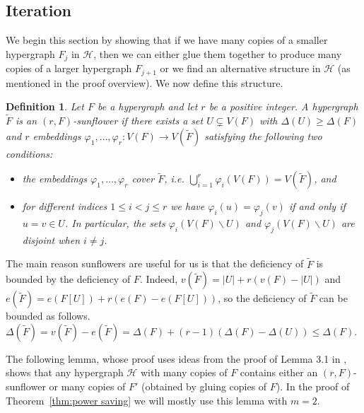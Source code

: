 \documentclass[11pt]{article}
\numberwithin{equation}{section}
\def\cH{\mathcal{H}}
\theoremstyle{plain}
\newtheorem{definition}[theorem]{Definition}
\theoremstyle{remark}
\begin{document}
\subsection{Iteration}\label{subsec:iteration}

We begin this section by showing that if we have many copies of a smaller hypergraph $F_j$ in $\cH$, then we can either glue them together to produce many copies of a larger hypergraph $F_{j+1}$ or  we find an alternative structure in $\cH$ (as mentioned in the proof overview). We now define this structure.

\begin{definition}
Let $F$ be a hypergraph and let $r$ be a positive integer. A hypergraph $\tilde F$ is an \textit{$(r, F)$-sunflower} if there exists a set $U\subsetneq V(F)$ with $\Delta(U)\geq \Delta(F)$ and $r$ embeddings $\varphi_1, \dots, \varphi_r:V(F)\to V(\tilde F)$ satisfying the following two conditions:
\begin{itemize}
    \item[(i)] the embeddings $\varphi_1, \dots, \varphi_r$ cover $\tilde F$, i.e. $\bigcup_{i=1}^r \varphi_i(V(F))=V(\tilde F)$, and 
    \item[(ii)] for different indices $1\leq i<j\leq r$ we have $\varphi_i(u)=\varphi_j(v)$ if and only if $u=v\in U$. In particular, the sets $\varphi_i(V(F)\backslash U)$ and $\varphi_j(V(F)\backslash U)$ are disjoint when $i\neq j$.
\end{itemize}
\end{definition}

The main reason sunflowers are useful for us is that the deficiency of $\tilde F$ is bounded by the deficiency of $F$. Indeed, $v(\tilde F)=|U|+r(v(F)-|U|)$ and $e(\tilde F)=e(F[U])+r(e(F)-e(F[U]))$, so the deficiency of $\tilde F$ can be bounded as follows. $\Delta(\tilde F)=v(\tilde F)-e(\tilde F)=\Delta(F)+(r-1)(\Delta(F)-\Delta(U))\leq \Delta(F)$.

The following lemma, whose proof uses ideas from the proof of Lemma 3.1 in \cite{CGLS23}, shows that any hypergraph $\cH$ with many copies of $F$ contains either an $(r, F)$-sunflower or many copies of $F'$ (obtained by gluing copies of $F$). In the proof of Theorem~\ref{thm:power saving} we will mostly use this lemma with $m=2$.
\end{document}
